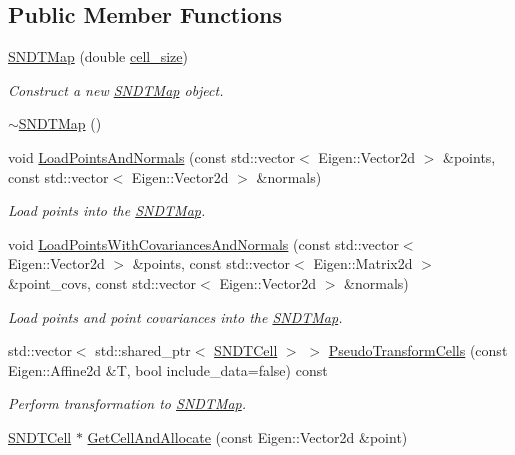 \subsection*{Public Member Functions}
\begin{DoxyCompactItemize}
\item 
\hyperlink{classSNDTMap_a813681a71844eb9e8df6bb0a267f5e99}{S\+N\+D\+T\+Map} (double \hyperlink{testl__match_8cc_a456553c1fc05d94c07e74c5fd45f6621}{cell\+\_\+size})
\begin{DoxyCompactList}\small\item\em Construct a new \hyperlink{classSNDTMap}{S\+N\+D\+T\+Map} object. \end{DoxyCompactList}\item 
\hyperlink{classSNDTMap_a84f70ba8ebdf71b84700bb3352f3bf4c}{$\sim$\+S\+N\+D\+T\+Map} ()
\item 
void \hyperlink{classSNDTMap_ad755706650d16e50957a9c7a7772f961}{Load\+Points\+And\+Normals} (const std\+::vector$<$ Eigen\+::\+Vector2d $>$ \&points, const std\+::vector$<$ Eigen\+::\+Vector2d $>$ \&normals)
\begin{DoxyCompactList}\small\item\em Load points into the \hyperlink{classSNDTMap}{S\+N\+D\+T\+Map}. \end{DoxyCompactList}\item 
void \hyperlink{classSNDTMap_afb229d2c2a8d58523743c0954fb8c0a8}{Load\+Points\+With\+Covariances\+And\+Normals} (const std\+::vector$<$ Eigen\+::\+Vector2d $>$ \&points, const std\+::vector$<$ Eigen\+::\+Matrix2d $>$ \&point\+\_\+covs, const std\+::vector$<$ Eigen\+::\+Vector2d $>$ \&normals)
\begin{DoxyCompactList}\small\item\em Load points and point covariances into the \hyperlink{classSNDTMap}{S\+N\+D\+T\+Map}. \end{DoxyCompactList}\item 
std\+::vector$<$ std\+::shared\+\_\+ptr$<$ \hyperlink{classSNDTCell}{S\+N\+D\+T\+Cell} $>$ $>$ \hyperlink{classSNDTMap_a64c45e8f2940a9037192b85b2aacd84b}{Pseudo\+Transform\+Cells} (const Eigen\+::\+Affine2d \&T, bool include\+\_\+data=false) const
\begin{DoxyCompactList}\small\item\em Perform transformation to \hyperlink{classSNDTMap}{S\+N\+D\+T\+Map}. \end{DoxyCompactList}\item 
\hyperlink{classSNDTCell}{S\+N\+D\+T\+Cell} $\ast$ \hyperlink{classSNDTMap_ad684a85e74b42f6aecdb42961789877e}{Get\+Cell\+And\+Allocate} (const Eigen\+::\+Vector2d \&point)

\end{DoxyCompactItemize}
